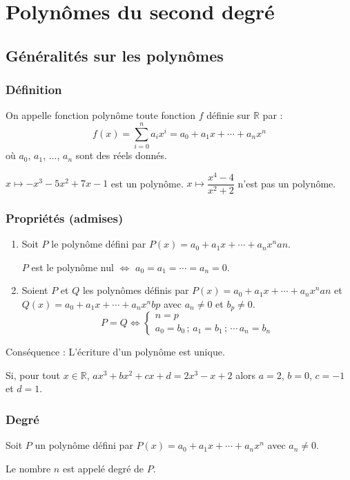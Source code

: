\documentclass[french]{book}
\newcommand{\R}{\mathbb {R}}
\newcommand{\poly}[1][a]{#1_0+#1_1x+\cdots+#1_nx^n}
\begin{document}
\tableofcontents
\chapter{Polynômes du second degré}
\section{Généralités sur les polynômes}
\subsection{Définition}
\begin{defn}
On appelle fonction polynôme toute fonction $f$ définie sur $\R$ par :
\[f(x)=\sum^n_{i=0} a_ix^i = a_0+a_1x+\cdots+a_nx^n \]
où $a_{0}$, $a_{1}$, $\ldots$, $a_{n}$ sont des réels donnés.
\end{defn}

\begin{exemple}
$x\mapsto -x^{3}-5x^{2}+7x-1$ est un polynôme. $x\mapsto \dfrac{x^{4}-4}{x^{2}+2}$ n'est pas un polynôme.
\end{exemple}%

\subsection{Propriétés (admises)}
\begin{prop}
\begin{enumerate}
\item Soit $P$ le polynôme défini par $P(x)=\poly{a}{n}$.

$P$ est le polynôme nul $\Longleftrightarrow$ $a_{0}=a_{1}=\cdots=a_{n}=0$.
\item Soient $P$ et $Q$ les polynômes définis par $P(x)=\poly{a}{n}$ et $Q(x)=\poly{b}{p}$ avec $a_{n}\neq0$ et $b_{p}\neq0$.
\[P=Q\Longleftrightarrow\left\lbrace
\begin{array}{l}
n=p \\
a_{0}=b_{0}\,;\, a_{1}=b_{1}\,;\,\cdots \,a_{n}=b_{n}
\end{array}
\right.\]
\end{enumerate}
\end{prop}
Conséquence : L'écriture d'un polynôme est unique.

\begin{exemple}
Si, pour tout $x\in\R$, $ax^3+bx^2+cx+d=2x^3-x+2$ alors $a=2$, $b=0$, $c=-1$ et $d=1$.
\end{exemple}
%
\subsection{Degré}
\begin{defn}
Soit $P$ un polynôme défini par $P(x)=\poly[a]$ avec $a_{n}\neq0$.

Le nombre $n$ est appelé degré de $P$.
\end{defn}
\end{document}
